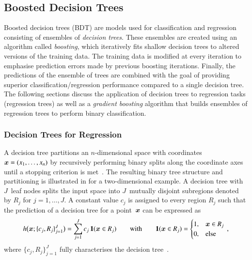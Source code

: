 \subsection{Boosted Decision Trees}%
\label{sec:bdt}

Boosted decision trees (BDT) are models used for classification and regression
consisting of ensembles of \emph{decision trees}. These ensembles are created
using an algorithm called \emph{boosting}, which iteratively fits shallow
decision trees
to altered versions of the training data. The training data is modified at every
iteration to emphasise prediction errors made by previous boosting
iterations. Finally, the predictions of the ensemble of trees are combined with
the goal of providing superior classification/regression performance compared to
a single decision tree. The following sections discuss the application of
decision trees to regression tasks (regression trees) as well as a
\emph{gradient boosting} algorithm that builds ensembles of regression trees to
perform binary classification.


\subsubsection{Decision Trees for Regression}

A decision tree partitions an $n$-dimensional space with coordinates
$\bm{x} = (x_1, \dots, x_n)$ by recursively performing binary splits along
the coordinate axes until a stopping criterion is
met~\cite{Breiman:1984jka,hastie09}. The resulting binary tree structure and
partitioning is illustrated in  for a two-dimensional
example. A decision tree with $J$~leaf nodes splits the input space into
$J$~mutually disjoint subregions denoted by $R_j$ for $j = 1, \dots, J$. A
constant value $c_j$ is assigned to every region $R_j$ such that the prediction
of a decision tree for a point~$\bm{x}$ can be expressed as
\begin{align*}
  h\bigl( \bm{x}; \{c_j, R_j\}_{j=1}^{J} \bigr) = \sum_{j = 1}^{J} c_j \, \mathbf{1}(\bm{x} \in R_j) \qquad \text{with} \qquad \mathbf{1}(\bm{x} \in R_j) =
  \begin{cases}
    1, & \bm{x} \in R_j \\
    0, & \text{else}
  \end{cases} \,\text{,}
\end{align*}
where $\{c_j, R_j\}_{j=1}^{J}$ fully characterises the decision
tree~\cite{hastie09}.

